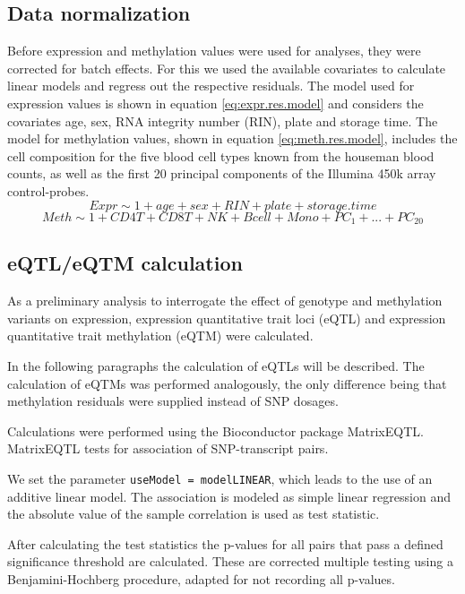 \documentclass[a4paper,12pt,twoside,openright]{article}
\begin{document}
\subsection{Data normalization}
\label{Methods:Data normalization}
Before expression and methylation values were used for analyses, they were corrected for batch effects. For this we used the available covariates to calculate linear models and regress out the respective residuals. The model used for expression values is shown in equation \ref{eq:expr.res.model} and considers the covariates age, sex, RNA integrity number (RIN), plate and storage time. The model for methylation values, shown in equation \ref{eq:meth.res.model},
includes the cell composition for the five blood cell types known from the houseman blood counts, as well as the first 20 principal components of the Illumina 450k array control-probes. 
\begin{equation}
\label{eq:expr.res.model}
Expr \sim 1+age+sex+RIN+plate+storage.time
\end{equation}
\begin{equation}
\label{eq:meth.res.model}
Meth \sim 1+CD4T+CD8T+NK+Bcell+Mono+PC_1+...+PC_{20}
\end{equation}


\subsection{eQTL/eQTM calculation}
\label{Methods:eQTL/eQTM calculation}
As a preliminary analysis to interrogate the effect of genotype and methylation variants on expression, expression quantitative trait loci (eQTL) and expression quantitative trait methylation (eQTM) were calculated.

In the following paragraphs the calculation of eQTLs will be described. The calculation of eQTMs was performed analogously, the only difference being that methylation residuals were supplied instead of SNP dosages.

Calculations were performed using the Bioconductor package MatrixEQTL\cite{10.1093/bioinformatics/bts163}. MatrixEQTL tests for association of SNP-transcript pairs.  

We set the parameter \texttt{useModel = modelLINEAR}, which leads to the use of an  additive linear model. The association is modeled as simple linear regression and the absolute value of the sample correlation is used as test statistic.

After calculating the test statistics the p-values for all pairs that pass a defined significance threshold are calculated. These are corrected multiple testing using a Benjamini-Hochberg procedure\cite{10.2307/2346101}, adapted for not recording all p-values.
\end{document}
